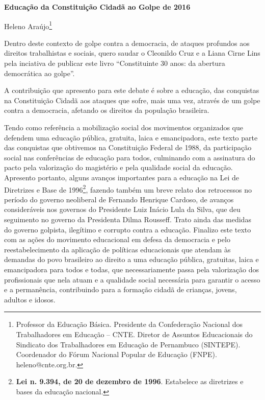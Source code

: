 \textbf{Educação da Constituição Cidadã ao Golpe de 2016}

Heleno Araújo\footnote{Professor da Educação Básica. Presidente da
  Confederação Nacional dos Trabalhadores em Educação -- CNTE. Diretor
  de Assuntos Educacionais do Sindicato dos Trabalhadores em Educação de
  Pernambuco (SINTEPE). Coordenador do Fórum Nacional Popular de
  Educação (FNPE). heleno@cnte.org.br.}

Dentro deste contexto de golpe contra a democracia, de ataques profundos
aos direitos trabalhistas e sociais, quero saudar o Cleonildo Cruz e a
Liana Cirne Lins pela inciativa de publicar este livro ``Constituinte 30
anos: da abertura democrática ao golpe''.

A contribuição que apresento para este debate é sobre a educação, das
conquistas na Constituição Cidadã aos ataques que sofre, mais uma vez,
através de um golpe contra a democracia, afetando os direitos da
população brasileira.

Tendo como referência a mobilização social dos movimentos organizados
que defendem uma educação pública, gratuita, laica e emancipadora, este
texto parte das conquistas que obtivemos na Constituição Federal de
1988, da participação social nas conferências de educação para todos,
culminando com a assinatura do pacto pela valorização do magistério e
pela qualidade social da educação. Apresento portanto, alguns avanços
importantes para a educação na Lei de Diretrizes e Base de
1996\footnote{\textbf{Lei n. 9.394, de 20 de dezembro de 1996}.
  Estabelece as diretrizes e bases da educação nacional.}, fazendo
também um breve relato dos retrocessos no período do governo neoliberal
de Fernando Henrique Cardoso, de avanços consideráveis nos governos do
Presidente Luiz Inácio Lula da Silva, que deu seguimento no governo da
Presidenta Dilma Rousseff. Trato ainda das medidas do governo golpista,
ilegítimo e corrupto contra a educação. Finalizo este texto com as ações
do movimento educacional em defesa da democracia e pelo
reestabelecimento da aplicação de políticas educacionais que atendam às
demandas do povo brasileiro ao direito a uma educação pública,
gratuitas, laica e emancipadora para todos e todas, que necessariamente
passa pela valorização dos profissionais que nela atuam e a qualidade
social necessária para garantir o acesso e a permanência, contribuindo
para a formação cidadã de crianças, jovens, adultos e idosos.

